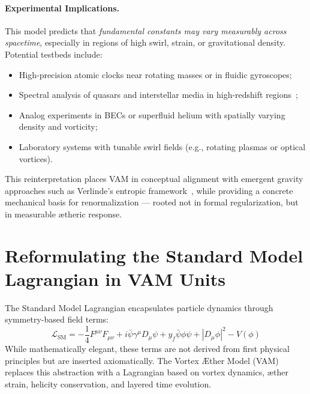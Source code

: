 \documentclass[12pt]{article}
\begin{document}
\paragraph{Experimental Implications.}
This model predicts that \emph{fundamental constants may vary measurably across spacetime}, especially in regions of high swirl, strain, or gravitational density. Potential testbeds include:
\begin{itemize}
    \item High-precision atomic clocks near rotating masses or in fluidic gyroscopes;
    \item Spectral analysis of quasars and interstellar media in high-redshift regions~\cite{shapiro2004variation, uzan2011varying};
    \item Analog experiments in BECs or superfluid helium with spatially varying density and vorticity;
    \item Laboratory systems with tunable swirl fields (e.g., rotating plasmas or optical vortices).
\end{itemize}

\vspace{0.5em}

This reinterpretation places VAM in conceptual alignment with emergent gravity approaches such as Verlinde’s entropic framework~\cite{verlinde2016emergent}, while providing a concrete mechanical basis for renormalization — rooted not in formal regularization, but in measurable ætheric response.
\section{Reformulating the Standard Model Lagrangian in VAM Units}\label{sec:lagrangian_vam}

The Standard Model Lagrangian encapsulates particle dynamics through symmetry-based field terms:
\begin{equation}
    \mathcal{L}_{\text{SM}} = -\frac{1}{4}F^{\mu\nu}F_{\mu\nu} + i\bar{\psi}\gamma^\mu D_\mu \psi + y_f \bar{\psi}\phi \psi + |D_\mu \phi|^2 - V(\phi)
\end{equation}
While mathematically elegant, these terms are not derived from first physical principles but are inserted axiomatically. The Vortex \AE{}ther Model (VAM) replaces this abstraction with a Lagrangian based on vortex dynamics, \ae{}ther strain, helicity conservation, and layered time evolution.
\end{document}
